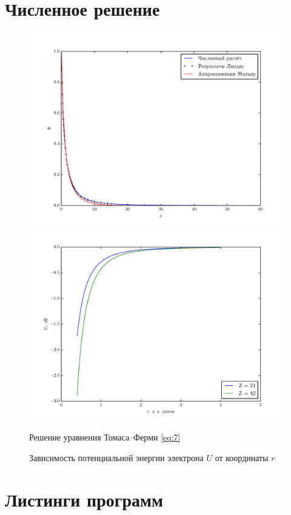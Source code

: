 \documentclass[10pt]{hedlab}
\begin{document}
  \section{Численное решение}
  \begin{figure}[h!]
    \vspace{-1em} \hspace{-2em}
      \includegraphics[width=.55\textwidth]{common} \hspace{-3em}
      \includegraphics[width=.55\textwidth]{Z_21_42} \\
    \parbox{.49\textwidth}{\caption{Решение уравнения Томаса--Ферми
      \eqref{eq:7}} \label{fig:1}}
      \parbox{.49\textwidth}{\caption{Зависимость потенциальной энергии
      электрона \( U \) от координаты \( r \)} \label{fig:2}}    
  \end{figure}
  \newpage
  \section{Листинги программ}
  
  
 
\end{document}
